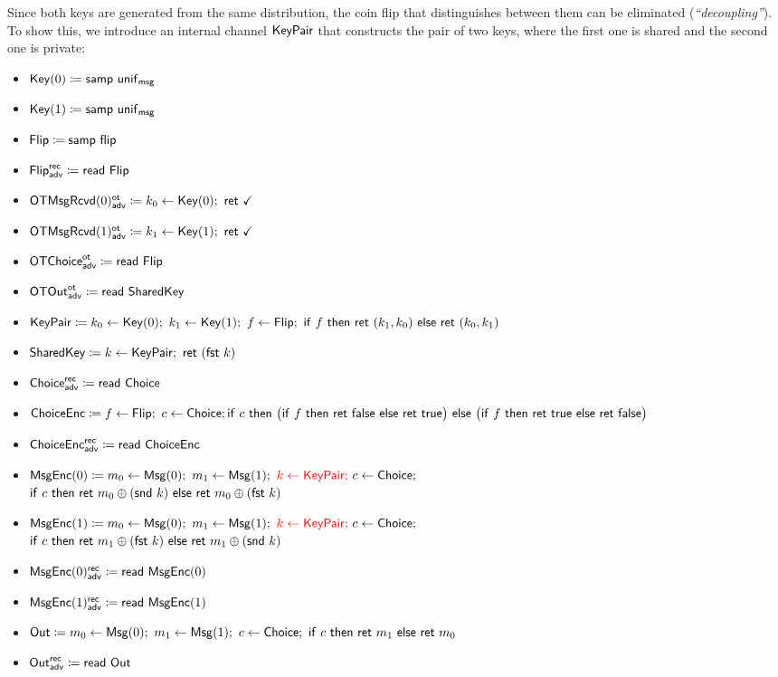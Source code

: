 \noindent Since both keys are generated from the same distribution, the coin flip that distinguishes between them can be eliminated (\emph{``decoupling''}). To show this, we introduce an internal channel $\mathsf{KeyPair}$ that constructs the pair of two keys, where the first one is shared and the second one is private:

\begin{itemize}
\item $\mathsf{Key}(0) \coloneqq \mathsf{samp} \ \mathsf{unif}_{\mathsf{msg}}$
\item $\mathsf{Key}(1) \coloneqq \mathsf{samp} \ \mathsf{unif}_{\mathsf{msg}}$
\item $\mathsf{Flip} \coloneqq \mathsf{samp} \ \mathsf{flip}$
\item {\color{blue} $\mathsf{Flip}^{\mathsf{rec}}_{\mathsf{adv}} \coloneqq \mathsf{read} \ \mathsf{Flip}$}
\item {\color{blue} $\LeakOTMsgRcvd(0)^\ot_\adv \coloneqq k_0 \leftarrow \Key(0); \ \ret{\checkmark}$}
\item {\color{blue} $\LeakOTMsgRcvd(1)^\ot_\adv \coloneqq k_1 \leftarrow \Key(1); \ \ret{\checkmark}$}
\item {\color{blue} $\mathsf{OTChoice}^{\mathsf{ot}}_{\mathsf{adv}} \coloneqq \mathsf{read} \ \mathsf{Flip}$}
\item {\color{blue} $\mathsf{OTOut}^{\mathsf{ot}}_{\mathsf{adv}} \coloneqq \mathsf{read} \ \mathsf{SharedKey}$}
\item {\color{red} $\KeyPair \coloneqq k_0 \leftarrow \Key(0); \ k_1 \leftarrow \Key(1); \ f \leftarrow \Flip; \ \ifte{f}{\ret{(k_1,k_0)}}{\ret{(k_0,k_1)}}$}
\item {\color{red} $\mathsf{SharedKey} \coloneqq k \leftarrow \mathsf{KeyPair}; \ \mathsf{ret} \ (\mathsf{fst} \ k)$}
\item {\color{blue} $\mathsf{Choice}^{\mathsf{rec}}_{\mathsf{adv}} \coloneqq \mathsf{read} \ \mathsf{Choice}$}
\item $\mathsf{ChoiceEnc} \coloneqq f \leftarrow \mathsf{Flip}; \ c \leftarrow \mathsf{Choice}; \\ \mathsf{if} \ c \ \mathsf{then} \ \big(\mathsf{if} \ f \ \mathsf{then} \ \mathsf{ret} \ \mathsf{false} \ \mathsf{else} \ \mathsf{ret} \ \mathsf{true}\big) \ \mathsf{else} \ \big(\mathsf{if} \ f \ \mathsf{then} \ \mathsf{ret} \ \mathsf{true} \ \mathsf{else} \ \mathsf{ret} \ \mathsf{false}\big)$
\item {\color{blue} $\mathsf{ChoiceEnc}^{\mathsf{rec}}_{\mathsf{adv}} \coloneqq \mathsf{read} \ \mathsf{ChoiceEnc}$}
\item $\mathsf{MsgEnc}(0) \coloneqq m_0 \leftarrow \mathsf{Msg}(0); \ m_1 \leftarrow \mathsf{Msg}(1); \ {\color{red} k \leftarrow \mathsf{KeyPair};} \ c \leftarrow \mathsf{Choice};$ \\ {\color{red} $\ifte{c}{\ret{m_0 \oplus (\snd \ k)}}{\ret{m_0 \oplus (\fst \ k)}}$}
\item $\mathsf{MsgEnc}(1) \coloneqq m_0 \leftarrow \mathsf{Msg}(0); \ m_1 \leftarrow \mathsf{Msg}(1); \ {\color{red} k \leftarrow \mathsf{KeyPair};} \ c \leftarrow \mathsf{Choice};$ \\ {\color{red} $\ifte{c}{\ret{m_1 \oplus (\fst \ k)}}{\ret{m_1 \oplus (\snd \ k)}}$}
\item {\color{blue} $\mathsf{MsgEnc}(0)^{\mathsf{rec}}_{\mathsf{adv}} \coloneqq \mathsf{read} \ \mathsf{MsgEnc}(0)$}
\item {\color{blue} $\mathsf{MsgEnc}(1)^{\mathsf{rec}}_{\mathsf{adv}} \coloneqq \mathsf{read} \ \mathsf{MsgEnc}(1)$}
\item $\Out \coloneqq m_0 \leftarrow \Msg(0); \ m_1 \leftarrow \Msg(1); \ c \leftarrow \Choice; \ \ifte{c}{\ret{m_1}}{\ret{m_0}}$
\item {\color{blue} $\mathsf{Out}^{\mathsf{rec}}_{\mathsf{adv}} \coloneqq \mathsf{read} \ \mathsf{Out}$}
\end{itemize}

